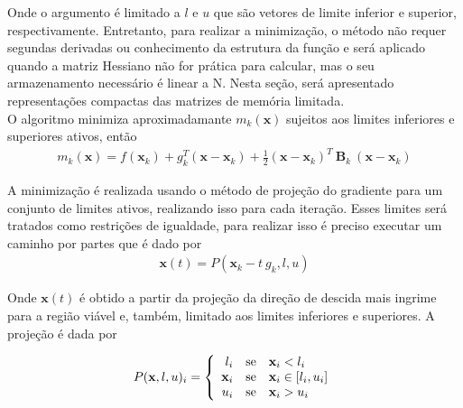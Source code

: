 Onde o argumento é limitado a $l$ e $u$ que são vetores de limite inferior e superior, respectivamente. Entretanto, para realizar a minimização, o método não requer segundas derivadas ou conhecimento da estrutura da função e será aplicado quando a matriz Hessiano não for prática para calcular, mas o seu armazenamento necessário é linear a N. Nesta seção, será apresentado representações compactas das matrizes de memória limitada. \\

O algoritmo minimiza aproximadamante $m_{k}(\mathbf{x})$ sujeitos aos limites inferiores e superiores ativos, então
\begin{eqnarray}
m_{k}(\mathbf{x}) = f(\mathbf{x}_{k}) + g_{k}^{T}(\mathbf{x}-\mathbf{x}_{k}) + \frac{1}{2} (\mathbf{x}-\mathbf{x}_{k})^{T} ~\mathbf{B}_{k}~(\mathbf{x}-\mathbf{x}_{k}) 
\label{quadratic}
\end{eqnarray}

A minimização é realizada usando o método de projeção do gradiente para um conjunto de limites ativos, realizando isso para cada iteração. Esses limites será tratados como restrições de igualdade, para realizar isso é preciso executar um caminho por partes que é dado por 
\begin{eqnarray}
 \mathbf{x}(t) = P(\mathbf{x}_k - t~g_{k}, l, u)
 \label{projecao}
\end{eqnarray}

Onde $\mathbf{x}(t)$ é obtido a partir da projeção da direção de descida mais ingrime para a região viável e, também, limitado aos limites inferiores e superiores. A projeção é dada por 

$$ P(\mathbf{x},l,u)_{i}
= \left\{ \begin{array}{rll}
          l_{i} & \hbox{se} & \mathbf{x}_{i} < l_{i} \\
          \mathbf{x}_{i} & \hbox{se} & \mathbf{x}_{i} \in \left[l_{i},u_{i} \right ] \\
          u_{i} & \hbox{se} & \mathbf{x}_{i} > u_{i}
          \end{array} \right. $$
          
